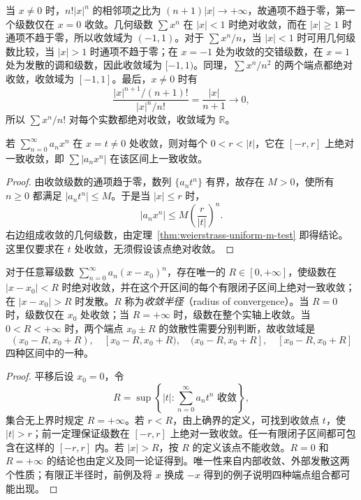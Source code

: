 \begin{solve}
当 $x\neq0$ 时，$n!|x|^n$ 的相邻项之比为 $(n+1)|x|\to+\infty$，故通项不趋于零，第一个级数仅在 $x=0$ 收敛。几何级数 $\sum x^n$ 在 $|x|<1$ 时绝对收敛，而在 $|x|\geq1$ 时通项不趋于零，所以收敛域为 $(-1,1)$。对于 $\sum x^n/n$，当 $|x|<1$ 时可用几何级数比较，当 $|x|>1$ 时通项不趋于零；在 $x=-1$ 处为收敛的交错级数，在 $x=1$ 处为发散的调和级数，因此收敛域为 $[-1,1)$。同理，$\sum x^n/n^2$ 的两个端点都绝对收敛，收敛域为 $[-1,1]$。最后，$x\neq0$ 时有
\[
    \frac{|x|^{n+1}/(n+1)!}{|x|^n/n!}
    =\frac{|x|}{n+1}\longrightarrow0,
\]
所以 $\sum x^n/n!$ 对每个实数都绝对收敛，收敛域为 $\mathbb R$。
\end{solve}

\begin{theorem}[由一个收敛点控制内部区间]
\label{thm:power-series-interior-absolute-uniform-convergence}
若 $\sum_{n=0}^\infty a_nx^n$ 在 $x=t\neq0$ 处收敛，则对每个 $0<r<|t|$，它在 $[-r,r]$ 上绝对一致收敛，即 $\sum |a_nx^n|$ 在该区间上一致收敛。
\end{theorem}

\begin{proof}
由收敛级数的通项趋于零，数列 $\{a_nt^n\}$ 有界，故存在 $M>0$，使所有 $n\geq0$ 都满足 $|a_nt^n|\leq M$。于是当 $|x|\leq r$ 时，
\[
    |a_nx^n|\leq M\left(\frac r{|t|}\right)^n.
\]
右边组成收敛的几何级数，由定理~\ref{thm:weierstrass-uniform-m-test} 即得结论。这里仅要求在 $t$ 处收敛，无须假设该点绝对收敛。
\end{proof}

\begin{theorem}[收敛半径与收敛域]
\label{thm:power-series-radius-and-domain}
对于任意幂级数 $\sum_{n=0}^\infty a_n(x-x_0)^n$，存在唯一的 $R\in[0,+\infty]$，使级数在 $|x-x_0|<R$ 时绝对收敛，并在这个开区间的每个有限闭子区间上绝对一致收敛；在 $|x-x_0|>R$ 时发散。$R$ 称为\emph{收敛半径}（radius of convergence）。当 $R=0$ 时，级数仅在 $x_0$ 处收敛；当 $R=+\infty$ 时，级数在整个实轴上收敛。当 $0<R<+\infty$ 时，两个端点 $x_0\pm R$ 的敛散性需要分别判断，故收敛域是
\[
    (x_0-R,x_0+R),\quad [x_0-R,x_0+R),\quad
    (x_0-R,x_0+R],\quad [x_0-R,x_0+R]
\]
四种区间中的一种。
\end{theorem}

\begin{proof}
平移后设 $x_0=0$，令
\[
    R=\sup\left\{|t|:\sum_{n=0}^\infty a_nt^n\text{ 收敛}\right\},
\]
集合无上界时规定 $R=+\infty$。若 $r<R$，由上确界的定义，可找到收敛点 $t$，使 $|t|>r$；前一定理保证级数在 $[-r,r]$ 上绝对一致收敛。任一有限闭子区间都可包含在这样的 $[-r,r]$ 内。若 $|x|>R$，按 $R$ 的定义该点不能收敛。$R=0$ 和 $R=+\infty$ 的结论也由定义及同一论证得到。唯一性来自内部收敛、外部发散这两个性质；有限正半径时，前例及将 $x$ 换成 $-x$ 得到的例子说明四种端点组合都可能出现。
\end{proof}

